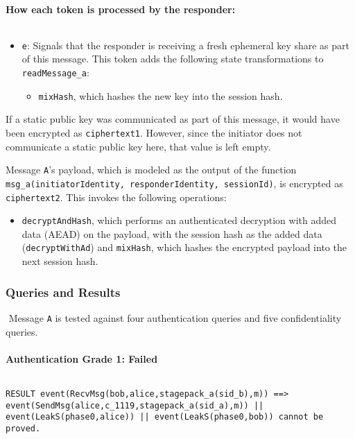 \paragraph{How each token is processed by the responder:}$ $

\begin{itemize}

\item \texttt{e}: Signals that the responder is receiving a fresh ephemeral key share as part of this message. This token adds the following state transformations to \texttt{readMessage\_a}:
\begin{itemize}

\item \texttt{mixHash}, which hashes the new key into the session hash.
\end{itemize}


\end{itemize}
If a static public key was communicated as part of this message, it would have been encrypted as \texttt{ciphertext1}. However, since the initiator does not communicate a static public key here, that value is left empty.


Message \texttt{A}'s payload, which is modeled as the output of the function \texttt{msg\_a(initiatorIdentity, responderIdentity, sessionId)}, is encrypted as \texttt{ciphertext2}. This invokes the following operations:


\begin{itemize}

\item \texttt{decryptAndHash}, which performs an authenticated decryption with added data (AEAD) on the payload, with the session hash as the added data (\texttt{decryptWithAd}) and \texttt{mixHash}, which hashes the encrypted payload into the next session hash.

\end{itemize}
\subsubsection{Queries and Results}$ $
Message \texttt{A} is tested against four authentication queries and five confidentiality queries.
\paragraph{Authentication Grade 1: Failed}$ $
\begin{lstlisting}
RESULT event(RecvMsg(bob,alice,stagepack_a(sid_b),m)) ==> event(SendMsg(alice,c_1119,stagepack_a(sid_a),m)) || event(LeakS(phase0,alice)) || event(LeakS(phase0,bob)) cannot be proved.
\end{lstlisting}


